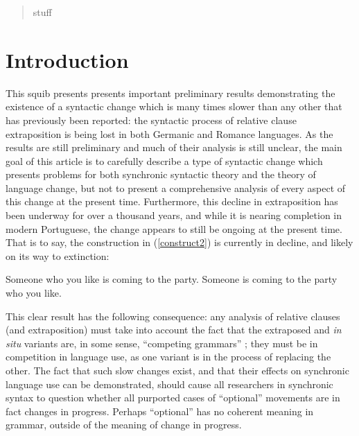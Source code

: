 \date{Received: date / Accepted: date}


\maketitle

\begin{abstract}
stuff
\end{abstract}

\section{Introduction}
\label{intro}
This squib presents presents important preliminary results demonstrating the existence of a syntactic change which is many times slower than any other that has previously been reported: the syntactic process of relative clause extraposition is being lost in both Germanic and Romance languages.
As the results are still preliminary and much of their analysis is still unclear, the main goal of this article is to carefully describe a type of syntactic change which presents problems for both synchronic syntactic theory and the theory of language change, but not to present a comprehensive analysis of every aspect of this change at the present time.
Furthermore, this decline in extraposition has been underway for over a thousand years, and while it is nearing completion in modern Portuguese, the change appears to still be ongoing at the present time. That is to say, the construction in (\ref{construct2}) is currently in decline, and likely on its way to extinction:

\begin{exe}
    \ex %
    \begin{xlist}
         \ex \label{construct1} Someone who you like is coming to the party.
         \ex \label{construct2} Someone is coming to the party who you like.
        \end{xlist}
\end{exe}


This clear result has the following consequence: any analysis of relative clauses (and extraposition) must take into account the fact that the extraposed and \textsl{in situ} variants are, in some sense, ``competing grammars'' \citep[in the sense of][inter alia]{kroch1989, kroch1994}; they must be in competition in language use, as one variant is in the process of replacing the other.
The fact that such slow changes exist, and that their effects on synchronic language use can be demonstrated, should cause all researchers in synchronic syntax to question whether all purported cases of ``optional'' movements are in fact changes in progress.
Perhaps ``optional'' has no coherent meaning in grammar, outside of the meaning of change in progress.


